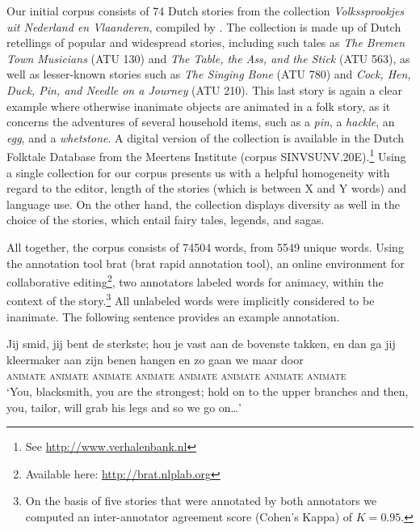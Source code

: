 \documentclass[a4paper,UKenglish]{oasics}
\begin{document}
Our initial corpus consists of 74 Dutch stories from the collection
\textit{Volkssprookjes uit Nederland en Vlaanderen}, compiled by
\cite{sinninghe:78}. The collection is made up of Dutch retellings of
popular and widespread stories, including such tales as \textit{The
  Bremen Town Musicians} (ATU 130) and \textit{The Table, the Ass, and
  the Stick } (ATU 563), as well as lesser-known stories such as
\textit{The Singing Bone} (ATU 780) and \textit{Cock, Hen, Duck, Pin,
  and Needle on a Journey} (ATU 210). This last story is again a clear
example where otherwise inanimate objects are animated in a folk
story, as it concerns the adventures of several household items, such
as a \textit{pin}, a \textit{hackle}, an \textit{egg}, and a
\textit{whetstone}. A digital version of the collection is available
in the Dutch Folktale Database from the Meertens Institute (corpus
SINVSUNV.20E).\footnote{See \url{http://www.verhalenbank.nl}} Using a
single collection for our corpus presents us with a helpful
homogeneity with regard to the editor, length of the stories (which is
between X and Y words) and language use. On the other hand, the
collection displays diversity as well in the choice of the stories,
which entail fairy tales, legends, and sagas.

All together, the corpus consists of 74504 words, from 5549 unique
words. Using the annotation tool brat (brat rapid annotation tool), an
online environment for collaborative editing\footnote{Available here:
  \url{http://brat.nlplab.org}}, two annotators labeled words for
animacy, within the context of the story.\footnote{On the basis of
  five stories that were annotated by both annotators we computed an
  inter-annotator agreement score (Cohen's Kappa) of $K=0.95$.} All
unlabeled words were implicitly considered to be inanimate. The
following sentence provides an example annotation.
\begin{exe}
\ex
\gll Jij smid, jij bent de sterkste; hou je vast aan de bovenste
takken, en dan ga jij kleermaker aan zijn benen hangen en zo gaan we maar door\\
    \textsc{animate} \textsc{animate} \textsc{animate} {} {} {} {} \textsc{animate} {} {} {} {} {} {} {} {} \textsc{animate} \textsc{animate}
    {} \textsc{animate} {} {} {} {} {} \textsc{animate} {} {} \\
\trans `You, blacksmith, you are the strongest; hold on to the upper
branches and then, you, tailor, will grab his legs and so we go on\ldots'
\end{exe}
\end{document}
